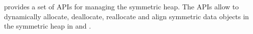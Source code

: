 \openshmem provides a set of \ac{API}s for managing the symmetric heap. The \ac{API}s allow to dynamically allocate, deallocate, reallocate and align symmetric data objects in the symmetric heap in \Clang{} and \Fortran.
